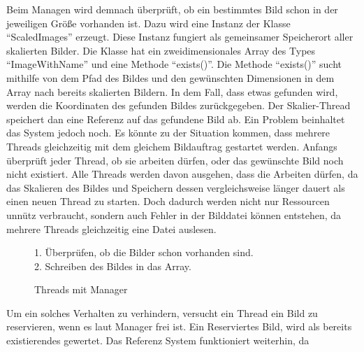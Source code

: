 Beim Managen wird demnach überprüft, ob ein bestimmtes Bild schon in der jeweiligen Größe vorhanden ist. Dazu wird eine Instanz der Klasse ``ScaledImages'' erzeugt. Diese Instanz fungiert als gemeinsamer Speicherort aller skalierten Bilder. Die Klasse hat ein zweidimensionales Array des Types ``ImageWithName'' und eine Methode ``exists()''. Die Methode ``exists()'' sucht mithilfe von dem Pfad des Bildes und den gewünschten Dimensionen in dem Array nach bereits skalierten Bildern. In dem Fall, dass etwas gefunden wird, werden die Koordinaten des gefunden Bildes zurückgegeben. Der Skalier-Thread speichert dan eine Referenz auf das gefundene Bild ab.
\medskip
\newline
Ein Problem beinhaltet das System jedoch noch. Es könnte zu der Situation kommen, dass mehrere Threads gleichzeitig mit dem gleichem Bildauftrag gestartet werden. Anfangs überprüft jeder Thread, ob sie arbeiten dürfen, oder das gewünschte Bild noch nicht existiert. Alle Threads werden davon ausgehen, dass die Arbeiten dürfen, da das Skalieren des Bildes und Speichern dessen vergleichsweise länger dauert als einen neuen Thread zu starten. Doch dadurch werden nicht nur Ressourcen unnütz verbraucht, sondern auch Fehler in der Bilddatei können entstehen, da mehrere Threads gleichzeitig eine Datei auslesen.

\begin{figure}[h]
    \centering
    \begin{minipage}{89mm}
        \fontsize{10pt}{11pt}\selectfont%
        \def\svgwidth{8cm}
        
    \end{minipage}
    \begin{minipage}{1\textwidth-91mm}
        1. Überprüfen, ob die Bilder schon vorhanden sind.\\
        2. Schreiben des Bildes in das Array.
    \end{minipage}
    \caption[Thread und Manager]{Threads mit Manager}
\end{figure}

Um ein solches Verhalten zu verhindern, versucht ein Thread ein Bild zu reservieren, wenn es laut Manager frei ist. Ein Reserviertes Bild, wird als bereits existierendes gewertet. Das Referenz System funktioniert weiterhin, da 